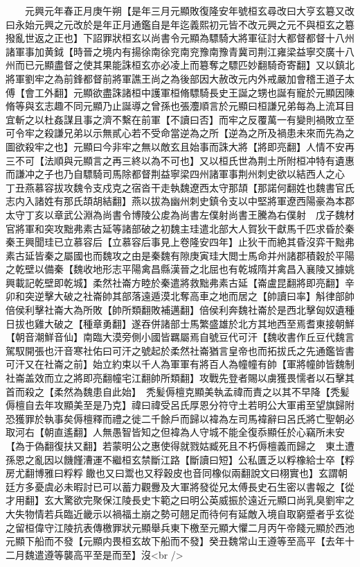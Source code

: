 　　元興元年春正月庚午朔【是年三月元顯敗復隆安年號桓玄尋改曰大亨玄簒又改曰永始元興之元改於是年正月通鑑自是年迄義熙初元皆不改元興之元不與桓玄之簒撥亂世返之正也】下詔罪狀桓玄以尚書令元顯為驃騎大將軍征討大都督都督十八州諸軍事加黄鉞【時晉之境内有揚徐南徐兖南兖豫南豫青冀司荆江雍梁益寧交廣十八州而已元顯盡督之使其果能誅桓玄亦必凌上而簒奪之驃匹妙翻騎奇寄翻】又以鎮北將軍劉牢之為前鋒都督前將軍譙王尚之為後部因大赦改元内外戒嚴加會稽王道子太傅【會工外翻】元顯欲盡誅諸桓中護軍桓脩驃騎長史王誕之甥也誕有寵於元顯因陳脩等與玄志趣不同元顯乃止誕導之曾孫也張灋順言於元顯曰桓謙兄弟每為上流耳目宜斬之以杜姦謀且事之濟不繫在前軍【不讀曰否】而牢之反覆萬一有變則禍敗立至可令牢之殺謙兄弟以示無貳心若不受命當逆為之所【逆為之所及禍患未來而先為之圖欲殺牢之也】元顯曰今非牢之無以敵玄且始事而誅大將【將即亮翻】人情不安再三不可【法順與元顯言之再三終以為不可也】又以桓氏世為荆土所附桓冲特有遺惠而謙冲之子也乃自驃騎司馬除都督荆益寧梁四州諸軍事荆州刺史欲以結西人之心　丁丑燕慕容拔攻魏令支戍克之宿沓干走執魏遼西太守那頡【那諾何翻姓也魏書官氏志内入諸姓有那氏頡胡結翻】燕以拔為幽州刺史鎮令支以中堅將軍遼西陽豪為本郡太守丁亥以章武公淵為尚書令博陵公䖍為尚書左僕射尚書王騰為右僕射　戊子魏材官將軍和突攻黜弗素古延等諸部破之初魏主珪遣北部大人賀狄干獻馬千匹求昏於秦秦王興聞珪已立慕容后【立慕容后事見上卷隆安四年】止狄干而絶其昏沒弈干黜弗素古延皆秦之屬國也而魏攻之由是秦魏有隙庚寅珪大閲士馬命并州諸郡積穀於平陽之乾壁以備秦【魏收地形志平陽禽昌縣漢晉之北屈也有乾城隋并禽昌入襄陵又據姚興載記乾壁即乾城】柔然社崙方睦於秦遣將救黜弗素古延【崙盧昆翻將即亮翻】辛卯和突逆擊大破之社崙帥其部落遠遁漠北奪高車之地而居之【帥讀曰率】斛律部帥倍侯利擊社崙大為所敗【帥所類翻敗補邁翻】倍侯利奔魏社崙於是西北擊匈奴遺種日拔也雞大破之【種章勇翻】遂吞併諸部士馬繁盛雄於北方其地西至焉耆東接朝鮮【朝音潮鮮音仙】南臨大漠旁側小國皆羈屬焉自號豆代可汗【魏收書作丘豆代魏言駕馭開張也汗音寒社佑曰可汗之號起於柔然社崙猶言皇帝也而拓拔氏之先通鑑皆書可汗又在社崙之前】始立約束以千人為軍軍有將百人為幢幢有帥【軍將幢帥皆魏制社崙盖效而立之將即亮翻幢宅江翻帥所類翻】攻戰先登者賜以虜獲畏懦者以石擊其首而殺之【柔然為魏患自此始】　秃髪傉檀克顯美執孟禕而責之以其不早降【秃髪傉檀自去年攻顯美至是乃克】禕曰禕受呂氏厚恩分符守土若明公大軍甫至望旗歸附恐獲罪於執事矣傉檀釋而禮之徙二千餘戶而歸以褘為左司馬褘辭曰呂氏將亡聖朝必取河右【朝直遙翻】人無愚智皆知之但褘為人守城不能全復忝顯任於心竊所未安【為于偽翻復扶又翻】若蒙明公之惠使得就戮姑臧死且不朽傉檀義而歸之　東土遭孫恩之亂因以饑饉漕運不繼桓玄禁斷江路【斷讀曰短】公私匱乏以粰橡給士卒【粰房尤翻博雅曰粰粰饊也又曰鬻也又稃穀皮也音同橡似兩翻說文曰栩實也】玄謂朝廷方多憂虞必未暇討已可以蓄力觀釁及大軍將發從兄太傅長史石生密以書報之【從才用翻】玄大驚欲完聚保江陵長史卞範之曰明公英威振於遠近元顯口尚乳臭劉牢之大失物情若兵臨近畿示以禍福土崩之勢可翹足而待何有延敵入境自取窮蹙者乎玄從之留桓偉守江陵抗表傳檄罪狀元顯舉兵東下檄至元顯大懼二月丙午帝餞元顯於西池元顯下船而不發【元顯内畏桓玄故下船而不發】癸丑魏常山王遵等至高平【去年十二月魏遣遵等襲高平至是而至】沒<br />
